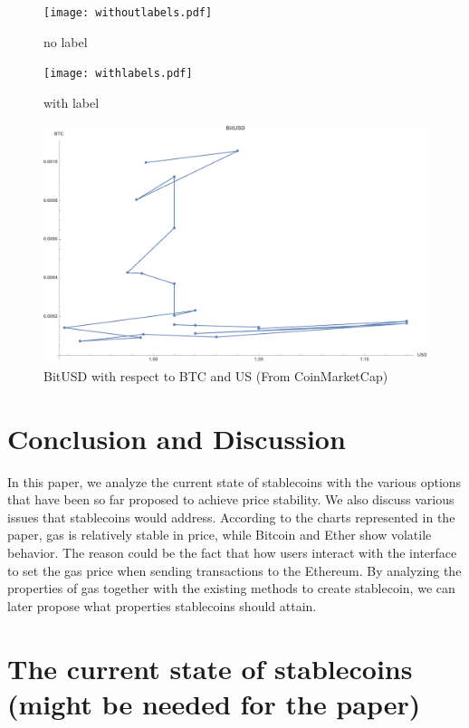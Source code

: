 
\begin{figure}[!htb]
	\texttt{[image: withoutlabels.pdf]}
	\caption{no label}\label{fig:cad1}
	\endminipage\hfill
	\texttt{[image: withlabels.pdf]}
	\caption{with label}\label{fig:eur1}
	\endminipage\hfill
	\includegraphics[width=\linewidth]{figures/BitUSD_CoinMarket.pdf}
	\caption{BitUSD with respect to BTC and US (From CoinMarketCap)}\label{fig:bitusd3}
	\endminipage\hfill
\end{figure}

\section{Conclusion and Discussion}
In this paper, we analyze the current state of stablecoins with the various options that have been so far proposed to achieve price stability. We also discuss various issues that stablecoins would address. According to the charts represented in the paper, gas is relatively stable in price, while Bitcoin and Ether show volatile behavior. The reason could be the fact that how users interact with the interface to set the gas price when sending transactions to the Ethereum. By analyzing the properties of gas together with the existing methods to create stablecoin, we can later propose what properties stablecoins should attain.

\section{The current state of stablecoins (might be needed for the paper)} 

